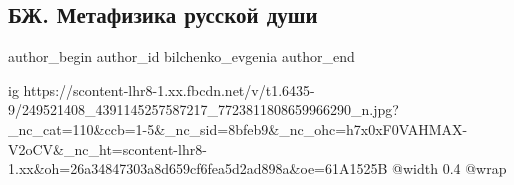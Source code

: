  
 
 
 
 
 
\subsection{БЖ. Метафизика русской души}
\label{sec:30_10_2021.fb.bilchenko_evgenia.1.metafizika_russkoj_dushi}
 
\ifcmt
 author_begin
   author_id bilchenko_evgenia
 author_end
\fi

\ifcmt
  ig https://scontent-lhr8-1.xx.fbcdn.net/v/t1.6435-9/249521408_4391145257587217_7723811808659966290_n.jpg?_nc_cat=110&ccb=1-5&_nc_sid=8bfeb9&_nc_ohc=h7x0xF0VAHMAX-V2oCV&_nc_ht=scontent-lhr8-1.xx&oh=26a34847303a8d659cf6fea5d2ad898a&oe=61A1525B
  @width 0.4
  @wrap 
\fi

